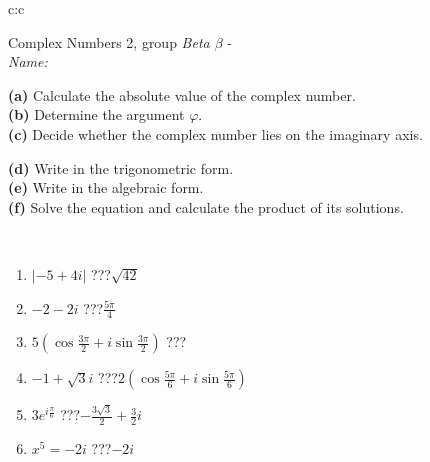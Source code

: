 \documentclass[10pt]{report}
\begin{document}
\newpage
\thispagestyle{empty}
\begin{tabular}{c:c}
\begin{minipage}[c][104.5mm][t]{0.5\linewidth}
\begin{center}
\vspace{5mm}
{\huge Complex Numbers 2, group \textit{Beta $\beta$} -}\\[5mm]
\textit{Name:}\phantom{xxxxxxxxxxxxxxxxxxxxxxxxxxxxxxxxxxxxxxxxxxxxxxxxxxxxxxxxxxxxxxxxx}\\[5mm]
\begin{minipage}{0.95\linewidth}
\begin{center}
{\small \begin{minipage}{0.44\textwidth} \raggedright
\textbf{(a)} Calculate the absolute value of the complex number. \\[1mm]
\textbf{(b)} Determine the argument \(\varphi\). \\[1mm]
\textbf{(c)} Decide whether the complex number lies on the imaginary axis. \end{minipage} \begin{minipage}{0.54\textwidth}
\textbf{(d)} Write in the trigonometric form. \\[1mm]
\textbf{(e)} Write in the algebraic form. \\[1mm]
\textbf{(f)} Solve the equation and calculate the product of its solutions.
\end{minipage}
}
\end{center}
\end{minipage}
\\[1mm]
\begin{minipage}{0.79\linewidth}
\begin{center}
\begin{varwidth}{\linewidth}
\setlength{\itemsep}{0pt}
\begin{enumerate}
\large
\item $|-5+4i|$\quad \dotfill\; ???\;\dotfill \quad $\sqrt{42}$
\item $-2-2i$\quad \dotfill\; ???\;\dotfill \quad $\frac{5\pi}{4}$
\item $5\left(\cos{\frac{3\pi}{2}}+i\sin{\frac{3\pi}{2}}\right)$\quad \dotfill\; ???\;\dotfill \quad {}
\item $-1+\sqrt{3}i$\quad \dotfill\; ???\;\dotfill \quad $2\left(\cos{\frac{5\pi}{6}}+i\sin{\frac{5\pi}{6}}\right)$
\item $3e^{i\frac{\pi}{6}}$\quad \dotfill\; ???\;\dotfill \quad $-\frac{3\sqrt{3}}{2}+\frac{3}{2}i$
\item $x^5=-2i$\quad \dotfill\; ???\;\dotfill \quad $-2i$

\end{enumerate}
\end{varwidth}
\end{center}
\end{minipage}
\end{center}
\end{minipage}
\end{tabular}
\end{document}
